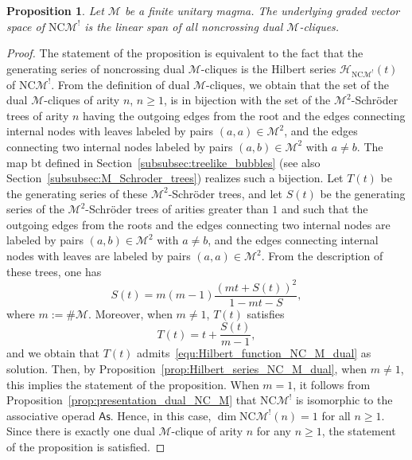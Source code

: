 \documentclass[10pt,reqno]{amsart}
\numberwithin{equation}{subsection}
\renewcommand{\geq}{\geqslant}
\newtheorem{Proposition}[Theorem]{Proposition}
\newcommand{\Mca}{\mathcal{M}}
\newcommand{\As}{\mathsf{As}}
\newcommand{\NC}{\mathrm{NC}}
\newcommand{\Hilbert}{\mathcal{H}}
\newcommand{\BubbleTree}{\mathrm{bt}}
\begin{document}
\begin{Proposition} \label{prop:elements_NC_M_dual}
    Let $\Mca$ be a finite unitary magma. The underlying graded vector
    space of $\NC\Mca^!$ is the linear span of all noncrossing dual
    $\Mca$-cliques.
\end{Proposition}
\begin{proof}
    The statement of the proposition is equivalent to the fact that the
    generating series of noncrossing dual $\Mca$-cliques is the Hilbert
    series $\Hilbert_{\NC\Mca^!}(t)$ of $\NC\Mca^!$. From the definition
    of dual $\Mca$-cliques, we obtain that the set of the dual
    $\Mca$-cliques of arity $n$, $n \geq 1$, is in bijection with the
    set of the $\Mca^2$-Schröder trees of arity $n$ having the outgoing
    edges from the root and the edges connecting internal nodes with
    leaves labeled by pairs $(a, a) \in \Mca^2$, and the edges
    connecting two internal nodes labeled by pairs $(a, b) \in \Mca^2$
    with $a \ne b$. The map $\BubbleTree$ defined in
    Section~\ref{subsubsec:treelike_bubbles} (see also
    Section~\ref{subsubsec:M_Schroder_trees}) realizes such a bijection.
    Let $T(t)$ be the generating series of these $\Mca^2$-Schröder
    trees, and let $S(t)$ be the generating series of the
    $\Mca^2$-Schröder trees of arities greater than $1$ and such that
    the outgoing edges from the roots and the edges connecting two
    internal nodes are labeled by pairs $(a, b) \in \Mca^2$ with
    $a \ne b$, and the edges connecting internal nodes with leaves are
    labeled by pairs $(a, a) \in \Mca^2$. From the description of these
    trees, one has
    \begin{equation}
        S(t) = m (m - 1) \frac{(mt + S(t))^2}{1 - mt - S},
    \end{equation}
    where $m := \# \Mca$. Moreover, when $m \ne 1$,  $T(t)$ satisfies
    \begin{equation}
        T(t) = t + \frac{S(t)}{m - 1},
    \end{equation}
    and we obtain that $T(t)$
    admits~\eqref{equ:Hilbert_function_NC_M_dual} as solution. Then, by
    Proposition~\ref{prop:Hilbert_series_NC_M_dual}, when $m \ne 1$,
    this implies the statement of the proposition. When $m = 1$, it
    follows from Proposition~\ref{prop:presentation_dual_NC_M} that
    $\NC\Mca^!$ is isomorphic to the associative operad $\As$. Hence, in
    this case, $\dim \NC\Mca^!(n) = 1$ for all $n \geq 1$. Since there
    is exactly one dual $\Mca$-clique of arity $n$ for any $n \geq 1$,
    the statement of the proposition is satisfied.
\end{proof}
\medskip
\end{document}
